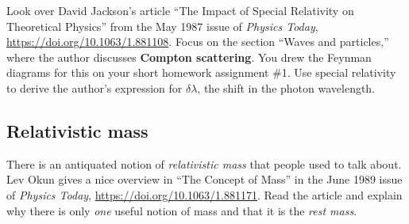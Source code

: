 \documentclass[12pt]{article}
\numberwithin{equation}{section}    %
\begin{document}
Look over David Jackson's article ``The Impact of Special Relativity on Theoretical Physics'' from the May 1987 issue of \emph{Physics Today}, \url{https://doi.org/10.1063/1.881108}. Focus on the section ``Waves and particles,'' where the author discusses \textbf{Compton scattering}. You drew the Feynman diagrams for this on your short homework assignment \#1. Use special relativity to derive the author's expression for $\delta\lambda$, the shift in the photon wavelength.

\subsection{Relativistic mass}

There is an antiquated notion of \emph{relativistic mass} that people used to talk about. Lev Okun gives a nice overview in ``The Concept of Mass'' in the June 1989 issue of \emph{Physics Today}, \url{https://doi.org/10.1063/1.881171}. Read the article and explain why there is only \emph{one} useful notion of mass and that it is the \emph{rest mass}.
\end{document}
